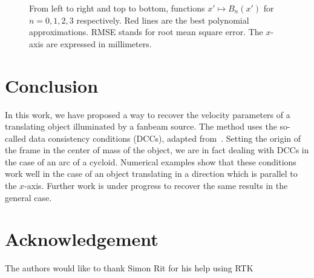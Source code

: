 \documentclass[9pt,technote]{IEEEtran}
\numberwithin{equation}{section}
\begin{document}
\begin{figure}[!ht]
\begin{tabular}{cc}
	\end{tabular}
	\caption{From left to right and top to bottom, functions $x' \mapsto B_n(x')$ for $n = 0,1,2,3$ respectively. Red lines are the best polynomial approximations. RMSE stands for root mean square error. The $x$-axis are expressed in millimeters.\label{fig:Bnx}}
\end{figure}

\section{Conclusion}
In this work, we have proposed a way to recover the velocity parameters of a translating object illuminated by a fanbeam source. The method uses the so-called data consistency conditions (DCCs), adapted from~\cite{clackdoyle2015consistency}. Setting the origin of the frame in the center of mass of the object, we are in fact dealing with DCCs in the case of an arc of a cycloid. Numerical examples show that these conditions work well in the case of an object translating in a direction which is parallel to the $x$-axis. Further work is under progress to recover the same results in the general case.

\section{Acknowledgement}
The authors would like to thank Simon Rit for his help using RTK



\end{document}
